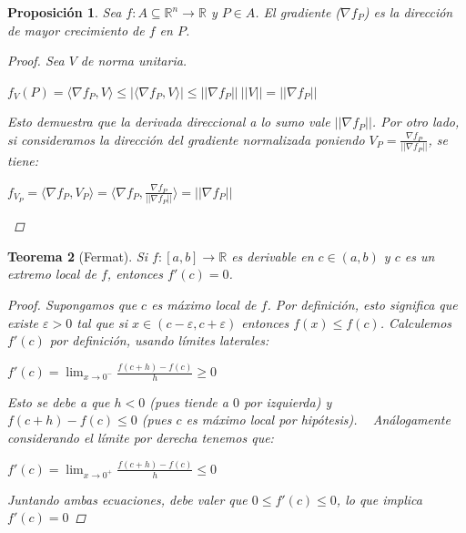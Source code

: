\documentclass[]{article}
\newtheorem{teo}{Teorema}
\newtheorem{prop}[teo]{Proposición}
\def\R{\mathbb{R}}
\def\e{\varepsilon}
\newcommand{\ip}[2]{\langle #1,#2 \rangle}
\begin{document}
\begin{prop}
	Sea $f:A\subseteq \R^n \to \R$ y $P \in A$. El gradiente ($\nabla f_P$) es la dirección de mayor crecimiento de $f$ en $P$.
	\begin{proof}
		Sea $V$ de norma unitaria.
		\begin{center}
			$f_V(P) = \ip{\nabla f_P}{V} \leq |\ip{\nabla f_P}{V}| \leq ||\nabla f_P||\ ||V|| = ||\nabla f_P||$
		\end{center}
		Esto demuestra que la derivada direccional a lo sumo vale $||\nabla f_P||$. Por otro lado, si consideramos la dirección del gradiente normalizada poniendo $V_P = \frac{\nabla f_P}{||\nabla f_P||}$, se tiene:
		\begin{center}
			$f_{V_P} = \ip{\nabla f_P}{V_P} = \ip{\nabla f_P}{\frac{\nabla f_P}{||\nabla f_P||}} = ||\nabla f_P||$
		\end{center}
	\end{proof}
\end{prop}

\begin{teo}[Fermat]
	Si $f:[a,b]\to \R$ es derivable en $c\in (a,b)$ y $c$ es un extremo local de $f$, entonces $f'(c)=0$.
	\begin{proof}
		Supongamos que $c$ es máximo local de $f$. Por definición, esto significa que existe $\e > 0$ tal que si $x \in (c-\e,c+\e)$ entonces $f(x) \leq f(c)$. Calculemos $f'(c)$ por definición, usando límites laterales:
		\begin{center}
			$\displaystyle f'(c) = \lim_{x\to 0^-} \frac{f(c+h)-f(c)}{h} \geq 0$
		\end{center}
		Esto se debe a que $h<0$ (pues tiende a $0$ por izquierda) y $f(c+h) - f(c) \leq 0$ (pues $c$ es máximo local por hipótesis).\newline
		~\newline
		Análogamente considerando el límite por derecha tenemos que:
		\begin{center}
			$\displaystyle f'(c) = \lim_{x\to 0^+} \frac{f(c+h)-f(c)}{h} \leq 0$
		\end{center}
		Juntando ambas ecuaciones, debe valer que  $0\leq f'(c) \leq 0$, lo que implica $f'(c) = 0$
	\end{proof}
\end{teo}
\end{document}

